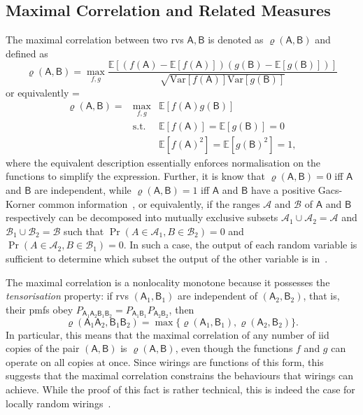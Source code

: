 \documentclass[10pt, a4paper]{article}
\numberwithin{equation}{section} %
\theoremstyle{definition}
\theoremstyle{plain}
\newenvironment{Array}[1] %
{\def\arraystretch{1.75}\everymath={\displaystyle}\begin{equation}\begin{array}{#1}}
{\end{array}\end{equation}}
\newcommand{\?}{\mathrel{?}} %
\newcommand{\E}{\mathbb{E}} %
\newcommand{\Var}{\mathrm{Var}} %
\newcommand{\sA}{\mathcal{A}}
\newcommand{\sB}{\mathcal{B}}
\newcommand{\crv}[1]{\mathsf{#1}}
\begin{document}
                  \subsection{Maximal Correlation and Related Measures}\label{sec:wirmono_maxcorr}

                  The maximal correlation between two rvs \(\crv{A},\crv{B}\) is denoted as \(\varrho(\crv{A},\crv{B})\) and defined as~\cite{NLMonotones}
                  \begin{equation}
                    \varrho(\crv{A},\crv{B}) = \max_{f,g} \frac{\E[(f(\crv{A})-\E[f(\crv{A})])(g(\crv{B})-\E[g(\crv{B})])]}{\sqrt{\Var[f(\crv{A})]\Var[g(\crv{B})]}}
                  \end{equation}
                  or equivalently
                  \begin{Array}{rcl}
                    \varrho(\crv{A},\crv{B}) = & \max_{f,g}  & \E[f(\crv{A})g(\crv{B})] \\
                                            & \text{s.t.} & \E[f(\crv{A})] = \E[g(\crv{B})] = 0 \\
                                            &             & \E[f(\crv{A})^2] = \E[g(\crv{B})^2] = 1,
                  \end{Array}
                  where the equivalent description essentially enforces normalisation on the functions to simplify the expression. Further, it is know that \(\varrho(\crv{A},\crv{B}) = 0\) iff \(\crv{A}\) and \(\crv{B}\) are independent, while \(\varrho(\crv{A},\crv{B}) = 1\) iff \(\crv{A}\) and \(\crv{B}\) have a positive Gacs-Korner common information~\cite{SeqPairsDepRV}, or equivalently, if the ranges \(\sA\) and \(\sB\) of \(\crv{A}\) and \(\crv{B}\) respectively can be decomposed into mutually exclusive subsets \(\sA_1 \cup \sA_2 = \sA\) and \(\sB_1 \cup \sB_2 = \sB\) such that \(\Pr(A \in \sA_1, B \in \sB_2) = 0\) and \(\Pr(A \in \sA_2, B \in \sB_1) = 0\). In such a case, the output of each random variable is sufficient to determine which subset the output of the other variable is in~\cite[Sec. V-C]{CorrReview}.

                  The maximal correlation is a nonlocality monotone because it possesses the \emph{tensorisation} property: if rvs \((\crv{A}_1, \crv{B}_1)\) are independent of \((\crv{A}_2,\crv{B}_2)\), that is, their pmfs obey \(P_{\crv{A}_1\crv{A}_2\crv{B}_1\crv{B}_2} = P_{\crv{A}_1\crv{B}_1}P_{\crv{A}_2\crv{B}_2}\), then~\cite[Cor. 4.i]{NLMonotones}
                  \begin{equation}
                    \varrho(\crv{A}_1\crv{A}_2,\crv{B}_1\crv{B}_2) = \max\{ \varrho(\crv{A}_1,\crv{B}_1), \varrho(\crv{A}_2,\crv{B}_2) \}.
                  \end{equation}
                  In particular, this means that the maximal correlation of any number of iid copies of the pair \((\crv{A},\crv{B})\) is \(\varrho(\crv{A},\crv{B})\), even though the functions \(f\) and \(g\) can operate on all copies at once. Since wirings are functions of this form, this suggests that the maximal correlation constrains the behaviours that wirings can achieve. While the proof of this fact is rather technical, this is indeed the case for locally random wirings~\cite[Thm 8]{NLMonotones}. 
\end{document}
